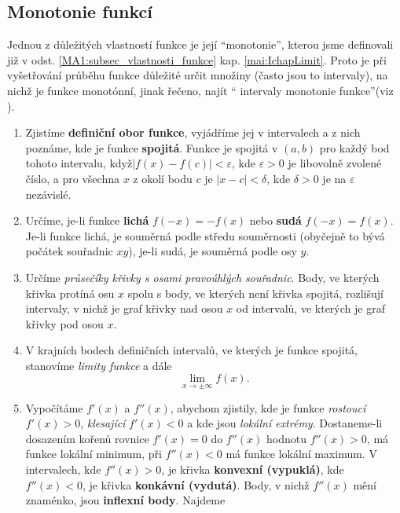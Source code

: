     \subsection{Monotonie funkcí}
      Jednou z důležitých vlastností funkce je její \textquotedblleft monotonie\textquotedblright, 
      kterou jsme definovali již v odst. \ref{MA1:subsec_vlastnosti_funkce} kap. 
      \ref{mai:IchapLimit}. Proto je při vyšetřování průběhu funkce důležité určit množiny (často 
      jsou to intervaly), na nichž je funkce monotónní, jinak řečeno, najít \textquotedblleft 
      intervaly monotonie funkce\textquotedblright (viz \cite[s.~208]{Brabec1989}). 
    \begin{enumerate}
      \item Zjistíme \textbf{definiční obor funkce}, vyjádříme jej v intervalech a z nich poznáme,  
            kde je funkce \textbf{spojitá}. Funkce je spojitá v $(a,b)$ pro každý bod tohoto 
            intervalu, když$|f(x)-f(c)|<\varepsilon$, kde $\varepsilon>0$ je libovolně zvolené 
            číslo, a pro všechna $x$ z okolí bodu $c$ je $|x-c|<\delta$, kde $\delta>0$ je na 
            $\varepsilon$ nezávislé.
      \item Určíme, je-li funkce \textbf{lichá} $f(-x)=-f(x)$ nebo \textbf{sudá} $f(-x)=f(x)$.   
            Je-li funkce lichá, je souměrná podle středu souměrnosti (obyčejně to bývá počátek 
            souřadnic $xy$), je-li sudá, je souměrná podle osy $y$.
      \item Určíme \emph{průsečíky křivky s osami pravoúhlých souřadnic}. Body, ve kte\-rých 
            křivka  protíná osu $x$ spolu s body, ve kte\-rých není křivka spojitá, rozlišují 
            intervaly, v nichž je graf křivky nad osou $x$ od intervalů, ve kterých je graf křivky 
            pod osou $x$.
      \item V krajních bodech definičních intervalů, ve kterých je funkce spojitá, stano\-víme 
      \emph{limity funkce} a dále $$\lim_{x \to \pm \infty}f(x).$$
      \item Vypočítáme $f'(x)$ a $f''(x)$, abychom zjistily, kde je funkce \emph{rostoucí}     
            $f'(x)>0$, \emph{klesající} $f'(x)<0$ a kde jsou \emph{lokální extrémy}. Dostaneme-li 
            dosazením kořenů rovnice $f'(x)=0$ do $f''(x)$ hodnotu $f''(x)>0$, má funkce lokální 
            minimum, při $f''(x)<0$ má funkce lokální maximum. V intervalech, kde $f''(x)>0$, je 
            křivka \textbf{konvexní (vypuklá)}, kde $f''(x)<0$, je křivka \textbf{konkávní 
            (vydutá)}. Body, v nichž $f''(x)$ mění znaménko, jsou \textbf{inflexní body}. Najdeme 

\end{enumerate}
